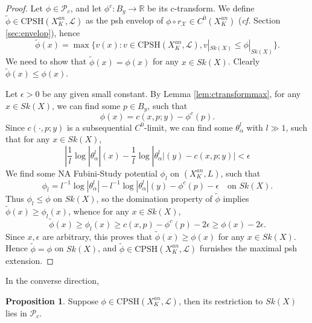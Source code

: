 \documentclass[a4paper]{article}
\theoremstyle{definition}
\newtheorem{prop}[thm]{Proposition}
\newcommand{\cf}{\emph{cf.} }
\newcommand{\R}{\mathbb{R}}
\begin{document}
	\begin{proof}
		Let $\phi\in \mathcal{P}_c$, and let $\phi^c: B_y\to \R$ be its $c$-transform. We define $\tilde{\phi} \in  \text{CPSH}(X_K^{an},\mathcal{L})$ as the psh envelop of $\phi\circ r_{\mathcal{X}}\in C^0(X_K^{an})$ (\cf Section \ref{sec:envelop}), hence
		\[
		\tilde{\phi}(x)= \max\{ v(x) :v\in \text{CPSH}(X_K^{an},\mathcal{L}), v|_{Sk(X)}\leq \phi|_{Sk(X)}\}. 
		\]
		We need to show that $\tilde{\phi}(x)= \phi(x)$ for any $x\in Sk(X)$. Clearly $\tilde{\phi}(x)\leq \phi(x)$. 
		
		
		
		
		Let $\epsilon>0$ be any given small constant. By Lemma \ref{lem:ctransformmax},
		for any $x\in Sk(X)$, we can find some $p\in B_y$, such that 
		\[
		\phi(x) = c(x,p;y)-\phi^c(p). 
		\]
		Since $c(\cdot ,p; y)$ is a subsequential $C^0$-limit, we can find some $\theta_\alpha^l$ with $l\gg 1$, such that for any $x\in Sk(X)$, 
		\[
		| \frac{1}{l}  \log |\theta_\alpha^l | (x)-   \frac{1}{l}  \log |\theta_\alpha^l | (y) - c(x,p;y) |< \epsilon
		\]
		We find some NA Fubini-Study potential $\phi_l$ on $(X_K^{an},L)$, such that 
		\[
		\phi_l = l^{-1} \log |\theta_\alpha^l|-  l^{-1} \log |\theta_\alpha^l | (y) - \phi^c(p)-\epsilon \quad \text{on $Sk(X)$}.
		\]
		Thus $\phi_l\leq \phi$ on $Sk(X)$, so the domination property of $\tilde{\phi}$ implies	
		$\tilde{\phi}(x)\geq \phi_l(x)$, whence for any $x\in Sk(X)$,
		\[
		\tilde{\phi}(x) \geq \phi_l(x)\geq   c(x,p)- \phi^c(p) -2\epsilon \geq \phi(x)-2\epsilon.
		\]
		Since $x,\epsilon$ are arbitrary, this proves that $\tilde{\phi}(x)\geq \phi(x)$ for any $x\in Sk(X)$. Hence $\tilde{\phi}= \phi$ on $Sk(X)$, and $\tilde{\phi}\in \text{CPSH}(X_K^{an},\mathcal{L})$ furnishes the maximal psh extension.
	\end{proof}
	
	
	
	In the converse direction,
	
	\begin{prop}\label{prop:maxextension2}
	Suppose $\phi \in \text{CPSH}(X_K^{an},\mathcal{L})$, then its restriction to $Sk(X)$ lies in $\mathcal{P}_c$.
	\end{prop}
	
	
	
	
	
\end{document}

